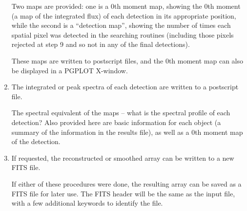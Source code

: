 \begin{enumerate}
  Two maps are provided: one is a 0th moment map, showing the 0th
  moment (\ie a map of the integrated flux) of each detection in its
  appropriate position, while the second is a ``detection map'',
  showing the number of times each spatial pixel was detected in the
  searching routines (including those pixels rejected at step 9 and so
  not in any of the final detections).

  These maps are written to postscript files, and the 0th moment map
  can also be displayed in a PGPLOT X-window.

\item The integrated or peak spectra of each detection are written to a
  postscript file. 

  The spectral equivalent of the maps -- what is the spectral profile
  of each detection? Also provided here are basic information for each
  object (a summary of the information in the results file), as well
  as a 0th moment map of the detection.

\item If requested, the reconstructed or smoothed array can be written
  to a new FITS file.

  If either of these procedures were done, the resulting array can be
  saved as a FITS file for later use. The FITS header will be the same
  as the input file, with a few additional keywords to identify the
  file. 

\end{enumerate}

